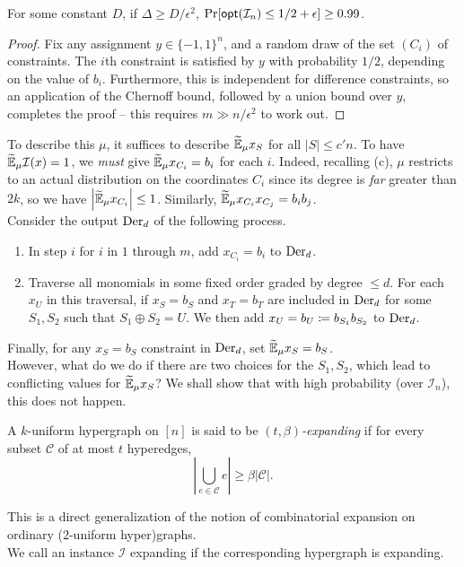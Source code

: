 	\begin{fprop}
		\label{prop:grig-small-true-opt}
		For some constant $D$, if $\Delta \ge D/\epsilon^2$, $\Pr[\mathsf{opt}(\mathcal{I}_n) \le 1/2 + \epsilon] \ge 0.99$.
	\end{fprop}
	\begin{proof}
		Fix any assignment $y \in \{-1,1\}^n$, and a random draw of the set $(C_i)$ of constraints. The $i$th constraint is satisfied by $y$ with probability $1/2$, depending on the value of $b_i$. Furthermore, this is independent for difference constraints, so an application of the Chernoff bound, followed by a union bound over $y$, completes the proof -- this requires $m \gg n/\epsilon^2$ to work out.
	\end{proof}
	To describe this $\mu$, it suffices to describe $\widetilde{\mathbb{E}}_\mu x_S$ for all $|S| \le c'n$. To have $\widetilde{\mathbb{E}}_\mu \mathcal{I}(x) = 1$, we \emph{must} give $\widetilde{\mathbb{E}}_\mu x_{C_i} = b_i$ for each $i$. Indeed, recalling (c), $\mu$ restricts to an actual distribution on the coordinates $C_i$ since its degree is \emph{far} greater than $2k$, so we have $\left|\widetilde{\mathbb{E}}_\mu x_{C_i}\right| \le 1$. Similarly, $\widetilde{\mathbb{E}}_\mu x_{C_i} x_{C_j} = b_i b_j$.\\
	Consider the output $\operatorname{Der}_d$ of the following process.
	\begin{enumerate}
		\item In step $i$ for $i$ in $1$ through $m$, add $x_{C_i} = b_i$ to $\operatorname{Der}_d$.
		\item Traverse all monomials in some fixed order graded by degree $\le d$. For each $x_U$ in this traversal, if  $x_S = b_S$ and $x_T = b_T$ are included in $\operatorname{Der}_d$ for some $S_1,S_2$ such that $S_1 \oplus S_2 = U$. We then add $x_U = b_U \coloneqq b_{S_1} b_{S_2}$ to $\operatorname{Der}_d$.
	\end{enumerate}
	Finally, for any $x_S = b_S$ constraint in $\operatorname{Der}_d$, set $\widetilde{\mathbb{E}}_\mu x_S = b_S$.\\
	However, what do we do if there are two choices for the $S_1,S_2$, which lead to conflicting values for $\widetilde{\mathbb{E}}_\mu x_S$? We shall show that with high probability (over $\mathcal{I}_n$), this does not happen.

	\begin{fdef}
		A $k$-uniform hypergraph on $[n]$ is said to be \emph{$(t,\beta)$-expanding} if for every subset $\mathcal{C}$ of at most $t$ hyperedges, 
		\[ \left| \bigcup_{e \in \mathcal{C}} e \right| \ge \beta |\mathcal{C}|. \]
	\end{fdef}
	This is a direct generalization of the notion of combinatorial expansion on ordinary ($2$-uniform hyper)graphs.\\
	We call an instance $\mathcal{I}$ expanding if the corresponding hypergraph is expanding.

